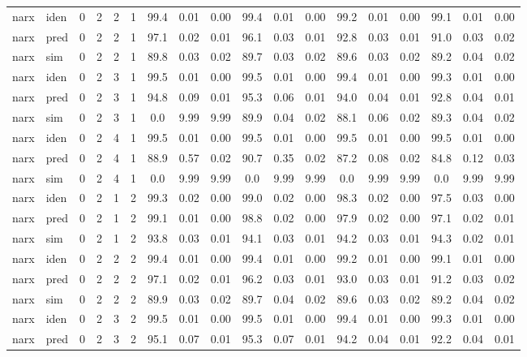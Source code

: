 \begin{landscape}
\begin{center}
\begin{longtable}{ll|cccc|ccc|ccc|ccc|ccc}
 \hline 
narx & iden & 0 & 2 & 2 & 1 & 99.4 & 0.01 & 0.00 & 99.4 & 0.01 & 0.00 & 99.2 & 0.01 & 0.00 & 99.1 & 0.01 & 0.00 \\ 
narx & pred & 0 & 2 & 2 & 1 & 97.1 & 0.02 & 0.01 & 96.1 & 0.03 & 0.01 & 92.8 & 0.03 & 0.01 & 91.0 & 0.03 & 0.02 \\ 
narx & sim  & 0 & 2 & 2 & 1 & 89.8 & 0.03 & 0.02 & 89.7 & 0.03 & 0.02 & 89.6 & 0.03 & 0.02 & 89.2 & 0.04 & 0.02 \\ 
 \hline 
narx & iden & 0 & 2 & 3 & 1 & 99.5 & 0.01 & 0.00 & 99.5 & 0.01 & 0.00 & 99.4 & 0.01 & 0.00 & 99.3 & 0.01 & 0.00 \\ 
narx & pred & 0 & 2 & 3 & 1 & 94.8 & 0.09 & 0.01 & 95.3 & 0.06 & 0.01 & 94.0 & 0.04 & 0.01 & 92.8 & 0.04 & 0.01 \\ 
narx & sim  & 0 & 2 & 3 & 1 & 0.0 & 9.99 & 9.99 & 89.9 & 0.04 & 0.02 & 88.1 & 0.06 & 0.02 & 89.3 & 0.04 & 0.02 \\ 
 \hline 
narx & iden & 0 & 2 & 4 & 1 & 99.5 & 0.01 & 0.00 & 99.5 & 0.01 & 0.00 & 99.5 & 0.01 & 0.00 & 99.5 & 0.01 & 0.00 \\ 
narx & pred & 0 & 2 & 4 & 1 & 88.9 & 0.57 & 0.02 & 90.7 & 0.35 & 0.02 & 87.2 & 0.08 & 0.02 & 84.8 & 0.12 & 0.03 \\ 
narx & sim  & 0 & 2 & 4 & 1 & 0.0 & 9.99 & 9.99 & 0.0 & 9.99 & 9.99 & 0.0 & 9.99 & 9.99 & 0.0 & 9.99 & 9.99 \\ 
 \hline 
narx & iden & 0 & 2 & 1 & 2 & 99.3 & 0.02 & 0.00 & 99.0 & 0.02 & 0.00 & 98.3 & 0.02 & 0.00 & 97.5 & 0.03 & 0.00 \\ 
narx & pred & 0 & 2 & 1 & 2 & 99.1 & 0.01 & 0.00 & 98.8 & 0.02 & 0.00 & 97.9 & 0.02 & 0.00 & 97.1 & 0.02 & 0.01 \\ 
narx & sim  & 0 & 2 & 1 & 2 & 93.8 & 0.03 & 0.01 & 94.1 & 0.03 & 0.01 & 94.2 & 0.03 & 0.01 & 94.3 & 0.02 & 0.01 \\ 
 \hline 
narx & iden & 0 & 2 & 2 & 2 & 99.4 & 0.01 & 0.00 & 99.4 & 0.01 & 0.00 & 99.2 & 0.01 & 0.00 & 99.1 & 0.01 & 0.00 \\ 
narx & pred & 0 & 2 & 2 & 2 & 97.1 & 0.02 & 0.01 & 96.2 & 0.03 & 0.01 & 93.0 & 0.03 & 0.01 & 91.2 & 0.03 & 0.02 \\ 
narx & sim  & 0 & 2 & 2 & 2 & 89.9 & 0.03 & 0.02 & 89.7 & 0.04 & 0.02 & 89.6 & 0.03 & 0.02 & 89.2 & 0.04 & 0.02 \\ 
 \hline 
narx & iden & 0 & 2 & 3 & 2 & 99.5 & 0.01 & 0.00 & 99.5 & 0.01 & 0.00 & 99.4 & 0.01 & 0.00 & 99.3 & 0.01 & 0.00 \\ 
narx & pred & 0 & 2 & 3 & 2 & 95.1 & 0.07 & 0.01 & 95.3 & 0.07 & 0.01 & 94.2 & 0.04 & 0.01 & 92.2 & 0.04 & 0.01 \\ 

\end{longtable}
\end{center}
\end{landscape}
